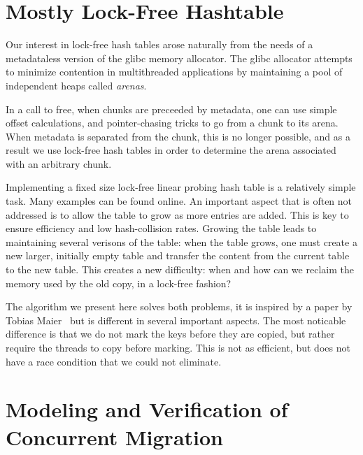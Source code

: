 \documentclass[twoside,12pt]{cslreport}
\begin{document}





\chapter{Mostly Lock-Free Hashtable}
\label{algorithm-details}

Our interest in lock-free hash tables arose naturally from the needs
of a metadataless version of the glibc memory allocator.  The glibc
allocator attempts to minimize contention in multithreaded
applications by maintaining a pool of independent heaps called \emph{arenas}.

In a call to free, when chunks are preceeded by metadata, one can use
simple offset calculations, and pointer-chasing tricks to go from a
chunk to its arena. When metadata is separated from the chunk,
this is no longer possible, and as a result we use lock-free hash
tables in order to determine the arena associated with an arbitrary
chunk.

Implementing a fixed size lock-free linear probing hash table is a
relatively simple task. Many examples can be found online. An
important aspect that is often not addressed is to allow the table to
grow as more entries are added. This is key to ensure efficiency and
low hash-collision rates. Growing the table leads to maintaining
several verisons of the table: when the table grows, one must create a
new larger, initially empty table and transfer the content from the
current table to the new table. This creates a new difficulty: when
and how can we reclaim the memory used by the old copy, in a lock-free
fashion?

The algorithm we present here solves both problems,
it is inspired by a paper by Tobias Maier~\cite{MaierSD16}
but is different in several important aspects. The most noticable difference
is that we do not mark the keys before they are copied, but rather require the
threads to copy before marking. This is not as efficient, but does not have
a race condition that we could not eliminate.





\chapter{Modeling and Verification of Concurrent Migration}
\label{verif}


\end{document}
